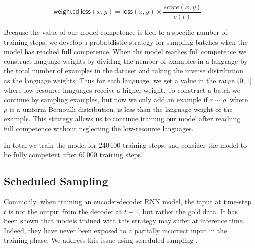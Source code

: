 \documentclass[11pt,a4paper]{article}
\newcommand\jp[1]{\textbf{JP: #1}}
\begin{document}
\begin{equation}
\mathsf{weighted\ loss}(x, y) = \mathsf{loss}(x, y) \times \frac{score(x, y)}{c(t)}
\end{equation}

Because the value of our model competence is tied to a specific number
of training steps, we develop a probabilistic strategy for sampling
batches when the model has reached full competence.  When the model
reaches full competence we construct language weights by dividing the
number of examples in a language by the total number of examples in
the dataset and taking the inverse distribution as the language
weights.
Thus for each language, we get a value in the range $(0,1]$ where
low-resource languages receive a higher weight.  To construct a batch
we continue by sampling examples, but now we only add an example if
$r \sim \rho$, where $\rho$ is a uniform Bernoulli distribution, is
less than the language weight of the example.  This strategy allows us
to continue training our model after reaching full competence without
neglecting the low-resource languages.

In total we train the model for $240\,000$ training steps, and consider
the model to be fully competent after $60\,000$ training steps.




\subsection{Scheduled Sampling}

Commonly, when training an encoder-decoder RNN model, the input at
time-step $t$ is not the output from the decoder at $t-1$, but rather
the gold data.  It has been shown that models trained with this
strategy may suffer at inference time. Indeed, they have never been
exposed to a partially incorrect input in the training phase.  We 
address this issue using scheduled sampling
\cite{DBLP:conf/nips/BengioVJS15}.
\end{document}
